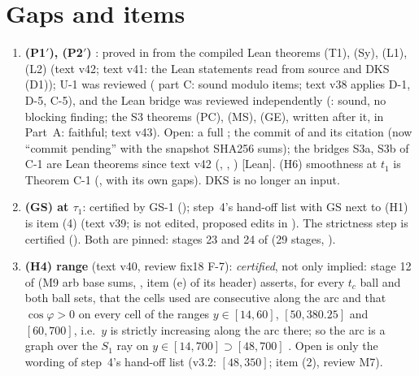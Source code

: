 \documentclass[11pt]{article}
\begin{document}
\section{Gaps and items}\label{C:sec:gaps}
\begin{enumerate}[leftmargin=*]
\providecommand{\LeanSthree}{\textup{[Lean]}}%
\item \textbf{(P1$'$), (P2$'$)} \tH: proved in  from the compiled Lean theorems (T1), (Sy), (L1), (L2) \cite{CWFlow} (text v42; text v41: the Lean statements read from source and DKS (D1)); U-1 was reviewed ( part C: sound modulo items; text v38 applies D-1, D-5, C-5), and the Lean bridge was reviewed independently (: sound, no blocking finding; the S3 theorems (PC), (MS), (GE), written after it, in  Part~A: faithful; text v43). Open: a full ; the commit of  and its citation (now ``commit pending'' with the snapshot SHA256 sums); the bridges S3a, S3b of C-1 are Lean theorems since text v42 (, , ) \LeanSthree. (H6) smoothness at $t_1$ is Theorem C-1 (, with its own gaps). DKS is no longer an input.
\item \textbf{(GS) at $\tau_1$}: certified by GS-1 (); step~4's hand-off list with GS next to (H1) is  item (4) (text v39;  is not edited, proposed edits in ). The strictness step is certified (). Both are pinned: stages 23 and 24 of  (29 stages, ).
\item \textbf{(H4) range} (text v40, review fix18 F-7): \emph{certified}, not only implied: stage 12 of  (M9 arb base sums, , item (e) of its header) asserts, for every $t_c$ ball and both ball sets, that the cells used are consecutive along the arc and that $\cos\varphi>0$ on every cell of the ranges $y\in[14,60]$, $[50,380.25]$ and $[60,700]$, i.e.\ $y$ is strictly increasing along the arc there; so the arc is a graph over the $S_1$ ray on $y\in[14,700]\supset[48,700]$ \tC. Open is only the wording of step~4's hand-off list (v3.2: $[48,350]$;  item (2), review M7).

\end{enumerate}
\end{document}

